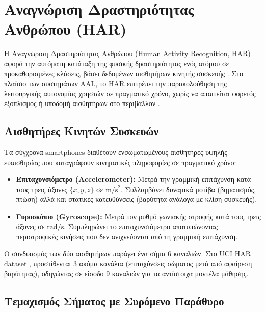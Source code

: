 
\section{Αναγνώριση Δραστηριότητας Ανθρώπου (HAR)}
\label{sec:har}

Η Αναγνώριση Δραστηριότητας Ανθρώπου (Human Activity Recognition, HAR)
αφορά την αυτόματη κατάταξη της φυσικής δραστηριότητας ενός ατόμου σε
προκαθορισμένες κλάσεις, βάσει δεδομένων αισθητήρων κινητής συσκευής
\cite{Anguita2013}. Στο πλαίσιο των συστημάτων AAL, το HAR επιτρέπει
την παρακολούθηση της λειτουργικής αυτονομίας χρηστών σε πραγματικό
χρόνο, χωρίς να απαιτείται φορετός εξοπλισμός ή υποδομή αισθητήρων
στο περιβάλλον \cite{Liu2021}.

\subsection{Αισθητήρες Κινητών Συσκευών}
\label{subsec:sensors}

Τα σύγχρονα smartphones διαθέτουν ενσωματωμένους αισθητήρες υψηλής
ευαισθησίας που καταγράφουν κινηματικές πληροφορίες σε πραγματικό χρόνο:

\begin{itemize}
    \item \textbf{Επιταχυνσιόμετρο (Accelerometer):} Μετρά την γραμμική
    επιτάχυνση κατά τους τρεις άξονες $\{x, y, z\}$ σε $\text{m/s}^2$.
    Συλλαμβάνει δυναμικά μοτίβα (βηματισμός, πτώση) αλλά και στατικές
    κατευθύνσεις (βαρύτητα ανάλογα με κλίση συσκευής).

    \item \textbf{Γυροσκόπιο (Gyroscope):} Μετρά τον ρυθμό γωνιακής
    στροφής κατά τους τρεις άξονες σε $\text{rad/s}$. Συμπληρώνει
    το επιταχυνσιόμετρο αποτυπώνοντας περιστροφικές κινήσεις που δεν
    ανιχνεύονται από τη γραμμική επιτάχυνση.
\end{itemize}

Ο συνδυασμός των δύο αισθητήρων παράγει ένα σήμα 6 καναλιών. Στο
UCI HAR dataset \cite{Anguita2013}, προστίθενται 3 ακόμα κανάλια
(επιταχύνσεις σώματος μετά από αφαίρεση βαρύτητας), οδηγώντας σε
είσοδο 9 καναλιών για τα αντίστοιχα μοντέλα μάθησης.

\subsection{Τεμαχισμός Σήματος με Συρόμενο Παράθυρο}
\label{subsec:sliding_window_bg}

